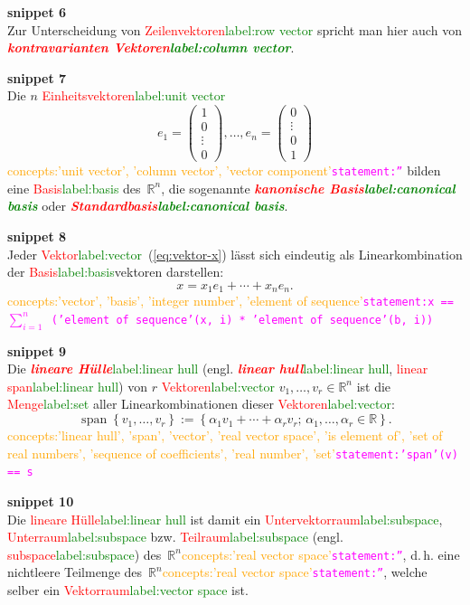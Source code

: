 \documentclass[a4paper,twoside,english,ngerman,deutsch,german,sectrefs,envcountsame,envcountchap]{svmono}
\newcommand{\setref}[2]{\textcolor{red}{#1}\textcolor{green}{#2}}
\newcommand{\snippet}[1]{\textbf{snippet #1}\\}
\newcommand{\eqnote}[2]{\textcolor{orange}{#1}\textcolor{magenta}{\texttt{#2}}}
\begin{document}
\snippet{6}
Zur Unterscheidung von \setref{Zeilenvektoren}{label:row vector} spricht man hier auch von \textbf{\em \setref{kontravarianten Vektoren}{label:column vector}}.

\snippet{7}
Die $n$ \setref{Einheitsvektoren}{label:unit vector}
\[
e_{1}=\left(\begin{array}{c} 1\\ 0\\
\vdots\\
0
\end{array}\right),\ldots,e_{n}=\left(\begin{array}{c}
0\\
\vdots\\
0\\ 1
\end{array}\right)
\]\eqnote{concepts:'unit vector', 'column vector', 'vector component'}{statement:''}
bilden eine \setref{Basis}{label:basis} des~${\mathbb{R}}^{n}$, die sogenannte \textbf{\em \setref{kanonische Basis}{label:canonical basis}} oder \textbf{\em \setref{Standardbasis}{label:canonical basis}}.

\snippet{8}
Jeder \setref{Vektor}{label:vector}~(\eqref{eq:vektor-x}) lässt sich eindeutig als Linearkombination der \setref{Basis}{label:basis}vektoren darstellen:
\[
x=x_{1}e_{1}+\cdots+x_{n}e_{n}.
\]\eqnote{concepts:'vector', 'basis', 'integer number', 'element of sequence'}{statement:x == $\sum_{i=1}^n$ ('element of sequence'(x, i) * 'element of sequence'(b, i))}

\snippet{9}
Die \setref{\textbf{\em lineare Hülle}}{label:linear hull} (engl. \setref{\textbf{\em linear hull}}{label:linear hull}, \setref{linear span}{label:linear hull}) von $r$ \setref{Vektoren}{label:vector} $v_{1},\ldots,v_{r}\in{\mathbb{R}}^{n}$ ist die \setref{Menge}{label:set} aller Linearkombinationen dieser \setref{Vektoren}{label:vector}:
\[
{\operatorname{span}}\left\{ v_{1},\ldots,v_{r}\right\} :=\left\{ \alpha_{1}v_{1}+\cdots+\alpha_{r}v_{r};\,\alpha_{1},\ldots,\alpha_{r}\in{\mathbb{R}}\right\} .
\]\eqnote{concepts:'linear hull', 'span', 'vector', 'real vector space', 'is element of', 'set of real numbers', 'sequence of coefficients', 'real number', 'set'}{statement:'span'(v) == s}

\snippet{10}
Die \setref{lineare Hülle}{label:linear hull} ist damit ein \setref{Untervektorraum}{label:subspace}, \setref{Unterraum}{label:subspace} bzw. \setref{Teilraum}{label:subspace} (engl. \setref{subspace}{label:subspace}) des~${\mathbb{R}}^{n}$\eqnote{concepts:'real vector space'}{statement:''}, d.\,h. eine nichtleere Teilmenge des~${\mathbb{R}}^{n}$\eqnote{concepts:'real vector space'}{statement:''}, welche selber ein \setref{Vektorraum}{label:vector space} ist.
\end{document}
